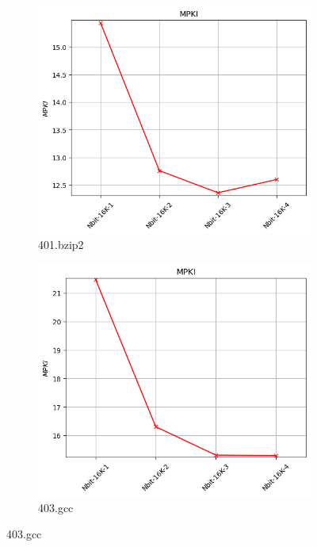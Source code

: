 \documentclass{article}
\begin{document}
\begin{figure}[H]
    \centering

    \begin{subfigure}[b]{0.45\textwidth}
        \includegraphics[width=\textwidth]{figures/5_3/401.bzip2.cslab_branch_preds_ref.out.png}
        \caption{401.bzip2}
        \label{fig:plot1}
    \end{subfigure}
    \hfill
    \begin{subfigure}[b]{0.45\textwidth}
        \includegraphics[width=\textwidth]{figures/5_3/403.gcc.cslab_branch_preds_ref.out.png}
        \caption{403.gcc}
        \label{fig:plot2}
    \end{subfigure}


\end{figure}
\end{document}
